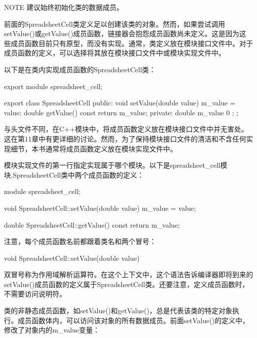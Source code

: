 \begin{myNotic}{NOTE}
建议始终初始化类的数据成员。
\end{myNotic}


前面的SpreadsheetCell类定义足以创建该类的对象。然而，如果尝试调用setValue()或getValue()成员函数，链接器会抱怨成员函数尚未定义。这是因为这些成员函数目前只有原型，而没有实现。通常，类定义放在模块接口文件中。对于成员函数的定义，可以选择将其放在模块接口文件中或模块实现文件中。

以下是在类内实现成员函数的SpreadsheetCell类：

\begin{cpp}
export module spreadsheet_cell;

export class SpreadsheetCell
{
    public:
        void setValue(double value) { m_value = value; }
        double getValue() const { return m_value; }
    private:
        double m_value { 0 };
};
\end{cpp}

与头文件不同，在C++模块中，将成员函数定义放在模块接口文件中并无害处。这在第11章中有更详细的讨论。然而，为了保持模块接口文件的清洁和不含任何实现细节，本书通常将成员函数定义放在模块实现文件中。

模块实现文件的第一行指定实现属于哪个模块。以下是spreadsheet\_cell模块,SpreadsheetCell类中两个成员函数的定义：

\begin{cpp}
module spreadsheet_cell;

void SpreadsheetCell::setValue(double value)
{
    m_value = value;
}

double SpreadsheetCell::getValue() const
{
    return m_value;
}

\end{cpp}

注意，每个成员函数名前都跟着类名和两个冒号：

\begin{cpp}
void SpreadsheetCell::setValue(double value)
\end{cpp}

双冒号称为作用域解析运算符。在这个上下文中，这个语法告诉编译器即将到来的setValue()成员函数的定义属于SpreadsheetCell类。还要注意，定义成员函数时，不需要访问说明符。


类的非静态成员函数，如setValue()和getValue()，总是代表该类的特定对象执行。成员函数体内，可以访问该对象的所有数据成员。前面setValue()的定义中，修改了对象内的m\_value变量：

